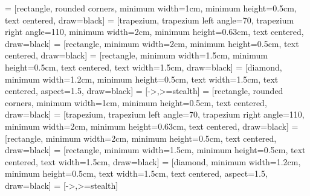 \makeatletter
\if@isELS
   = [rectangle, rounded corners, minimum width=1cm, minimum height=0.5cm, text centered, draw=black]
          = [trapezium, trapezium left angle=70, trapezium right angle=110, minimum width=2cm, minimum height=0.63cm, text centered, draw=black]
     = [rectangle, minimum width=2cm,   minimum height=0.5cm, text centered, draw=black]
   = [rectangle, minimum width=1.5cm, minimum height=0.5cm, text centered, text width=1.5cm, draw=black]
    = [diamond, minimum width=1.2cm, minimum height=0.5cm, text width=1.5cm, text centered, aspect=1.5, draw=black]
       = [->,>=stealth]
\fi
\if@isLNCS
   = [rectangle, rounded corners, minimum width=1cm, minimum height=0.5cm, text centered, draw=black]
          = [trapezium, trapezium left angle=70, trapezium right angle=110, minimum width=2cm, minimum height=0.63cm, text centered, draw=black]
     = [rectangle, minimum width=2cm,   minimum height=0.5cm, text centered, draw=black]
   = [rectangle, minimum width=1.5cm, minimum height=0.5cm, text centered, text width=1.5cm, draw=black]
    = [diamond, minimum width=1.2cm, minimum height=0.5cm, text width=1.5cm, text centered, aspect=1.5, draw=black]
       = [->,>=stealth]
  \newcommand{\markline}[1]{%
    \tikz[remember picture,baseline] \node (#1) {};%
  }
\fi
\makeatother

\makeatletter
\if@isACM
  \usepackage{fontawesome5}
\fi
\makeatother

\usepackage{listings}
\lstset{
  language=Python,
  stepnumber=1,
  numbersep=5pt,
  tabsize=4,
  basicstyle=\scriptsize\ttfamily,
  columns=fullflexible,
  keepspaces,
  showstringspaces=false
}

\makeatletter
\if@isACM
\fi
\makeatother

